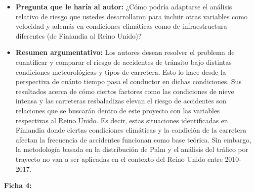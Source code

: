 \documentclass[12pt]{article}
\begin{document}
\begin{itemize}
	\item \textbf{Pregunta que le haría al autor:} ¿Cómo podría adaptarse el análisis relativo de riesgo que ustedes desarrollaron para incluir otras variables como velocidad y además en condiciones climáticas como de infraestructura diferentes (de Finlandia al Reino Unido)?    
 
	\item \textbf{Resumen argumentativo:} Los autores desean resolver el problema de cuantificar y comparar el riesgo de accidentes de tránsito bajo distintas condiciones meteorológicas y tipos de carretera. Esto lo hace desde la perspectiva de cuánto tiempo pasa el conductor en dichas condiciones. Sus resultados acerca de cómo ciertos factores como las condiciones de nieve intensa y las carreteras resbaladizas elevan el riesgo de accidentes son relaciones que se buscarán dentro de este proyecto con las variables respectivas al Reino Unido. Es decir, estas situaciones identificadas en Finlandia donde ciertas condiciones climáticas y la condición de la carretera afectan la frecuencia de accidentes funcionan como base teórica. Sin embargo, la metodología basada en la distribución de Palm y el análisis del tráfico por trayecto no van a ser aplicadas en el contexto del Reino Unido entre 2010-2017. \\  
\end{itemize}


\textbf{Ficha 4:}
\end{document}
